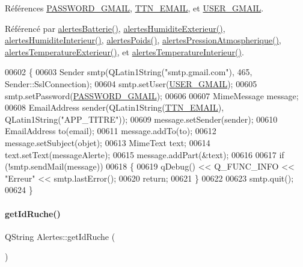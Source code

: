 Références \hyperlink{parametres_8h_a29c7597b5c4dfd015628a777f545bcb2}{P\+A\+S\+S\+W\+O\+R\+D\+\_\+\+G\+M\+A\+IL}, \hyperlink{parametres_8h_a45133c820662f13b719dcc1729242e61}{T\+T\+N\+\_\+\+E\+M\+A\+IL}, et \hyperlink{parametres_8h_a4a0b02d56c77af5d5aceb6c9f57cfb31}{U\+S\+E\+R\+\_\+\+G\+M\+A\+IL}.



Référencé par \hyperlink{class_alertes_ad708a4b800d56c1439b65d12a3c6b027}{alertes\+Batterie()}, \hyperlink{class_alertes_a8606946eaa04dfd29bb7951b2b850a04}{alertes\+Humidite\+Exterieur()}, \hyperlink{class_alertes_a7558cb097dc392547ceb12ab4d6cbd4c}{alertes\+Humidite\+Interieur()}, \hyperlink{class_alertes_ac4b8925cc6c262cf7254b1576ba07d33}{alertes\+Poids()}, \hyperlink{class_alertes_ab8a33e82cdd4d4e0560c9ba6e10ca8d5}{alertes\+Pression\+Atmospherique()}, \hyperlink{class_alertes_a91fb2665fa8b6c32c74bfe4d1b89a2d8}{alertes\+Temperature\+Exterieur()}, et \hyperlink{class_alertes_a8bc56cf9eb525624b2c1f5b20f86724b}{alertes\+Temperature\+Interieur()}.


\begin{DoxyCode}
00602 \{
00603     Sender smtp(QLatin1String(\textcolor{stringliteral}{"smtp.gmail.com"}), 465, Sender::SslConnection);
00604     smtp.setUser(\hyperlink{parametres_8h_a4a0b02d56c77af5d5aceb6c9f57cfb31}{USER\_GMAIL});
00605     smtp.setPassword(\hyperlink{parametres_8h_a29c7597b5c4dfd015628a777f545bcb2}{PASSWORD\_GMAIL});
00606 
00607     MimeMessage message;
00608     EmailAddress sender(QLatin1String(\hyperlink{parametres_8h_a45133c820662f13b719dcc1729242e61}{TTN\_EMAIL}), QLatin1String(\textcolor{stringliteral}{"APP\_TITRE"}));
00609     message.setSender(sender);
00610     EmailAddress to(email);
00611     message.addTo(to);
00612     message.setSubject(objet);
00613     MimeText text;
00614     text.setText(messageAlerte);
00615     message.addPart(&text);
00616 
00617     \textcolor{keywordflow}{if} (!smtp.sendMail(message))
00618     \{
00619         qDebug() << Q\_FUNC\_INFO << \textcolor{stringliteral}{"Erreur"} << smtp.lastError();
00620         \textcolor{keywordflow}{return};
00621     \}
00622 
00623     smtp.quit();
00624 \}
\end{DoxyCode}
\mbox{\label{class_alertes_a2374f9e3e5dc95eacaa4eaa5d98540a7}} 
\paragraph{\texorpdfstring{get\+Id\+Ruche()}{getIdRuche()}}
{\footnotesize\ttfamily Q\+String Alertes\+::get\+Id\+Ruche (\begin{DoxyParamCaption}{ }\end{DoxyParamCaption})}



